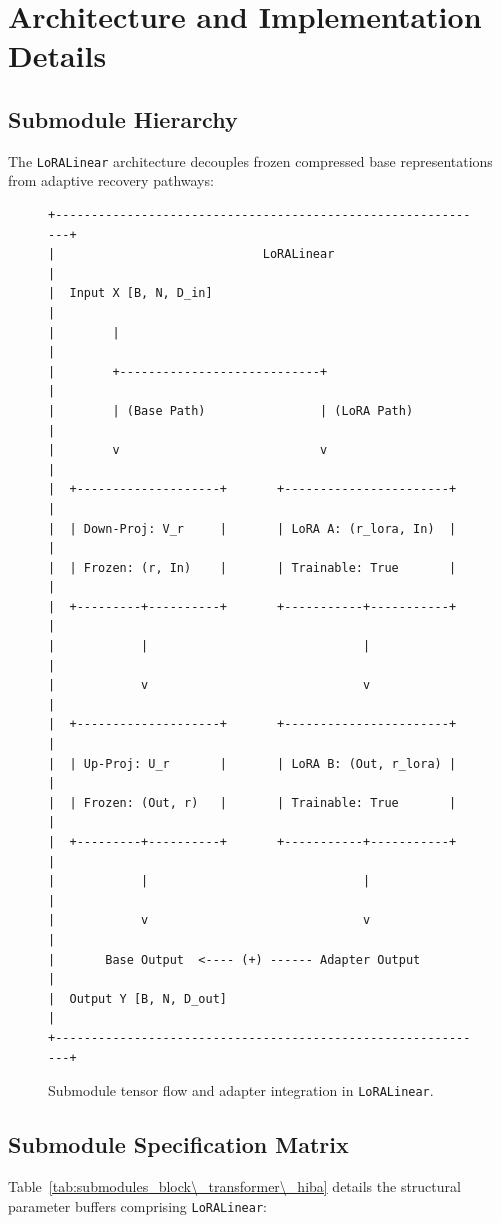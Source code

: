 \section{Architecture and Implementation Details}

\subsection{Submodule Hierarchy}
The \texttt{LoRALinear} architecture decouples frozen compressed base representations from adaptive recovery pathways:

\begin{figure}[H]
\centering
\begin{verbatim}
+-------------------------------------------------------------+
|                             LoRALinear                      |
|  Input X [B, N, D_in]                                       |
|        |                                                    |
|        +----------------------------+                       |
|        | (Base Path)                | (LoRA Path)           |
|        v                            v                       |
|  +--------------------+       +-----------------------+     |
|  | Down-Proj: V_r     |       | LoRA A: (r_lora, In)  |     |
|  | Frozen: (r, In)    |       | Trainable: True       |     |
|  +---------+----------+       +-----------+-----------+     |
|            |                              |                 |
|            v                              v                 |
|  +--------------------+       +-----------------------+     |
|  | Up-Proj: U_r       |       | LoRA B: (Out, r_lora) |     |
|  | Frozen: (Out, r)   |       | Trainable: True       |     |
|  +---------+----------+       +-----------+-----------+     |
|            |                              |                 |
|            v                              v                 |
|       Base Output  <---- (+) ------ Adapter Output          |
|  Output Y [B, N, D_out]                                     |
+-------------------------------------------------------------+
\end{verbatim}
\caption{Submodule tensor flow and adapter integration in \texttt{LoRALinear}.}
\end{figure}

\subsection{Submodule Specification Matrix}
Table~\ref{tab:submodules_block\_transformer\_hiba} details the structural parameter buffers comprising \texttt{LoRALinear}:

